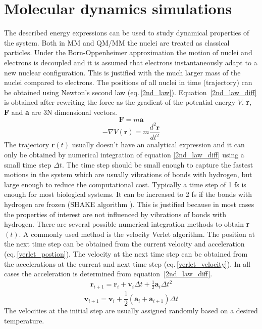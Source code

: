 \section{Molecular dynamics simulations}
The described energy expressions can be used to study dynamical properties of the system. Both in MM and QM/MM the nuclei are treated as classical particles. Under the Born-Oppenheimer approximation the motion of nuclei and electrons is decoupled and it is assumed that electrons instantaneously adapt to a new nuclear configuration. This is justified with the much larger mass of the nuclei compared to electrons. The positions of all nuclei in time (trajectory) can be obtained using Newton's second law (eq.\,\ref{2nd_law}). Equation~\ref{2nd_law_diff} is obtained after rewriting the force as the gradient of the potential energy $V$. \textbf{r}, \textbf{F} and \textbf{a} are 3N dimensional vectors.
\begin{equation} \label{2nd_law}
    \textbf{F} = m \textbf{a}
\end{equation}
\begin{equation} \label{2nd_law_diff}
    - \nabla V(\textbf{r}) = m \frac{d^2 \textbf{r}}{dt^2}
\end{equation}
The trajectory \textbf{r}$(t)$ usually doesn't have an analytical expression and it can only be obtained by numerical integration of equation \ref{2nd_law_diff} using a small time step $\Delta t$. The time step should be small enough to capture the fastest motions in the system which are usually vibrations of bonds with hydrogen, but large enough to reduce the computational cost. Typically a time step of 1 fs is enough for most biological systems. It can be increased to 2 fs if the bonds with hydrogen are frozen (SHAKE algorithm \cite{Tobias1988}). This is justified because in most cases the properties of interest are not influenced by vibrations of bonds with hydrogen. There are several possible numerical integration methods to obtain \textbf{r}$(t)$. A commonly used method is the velocity Verlet algorithm. The position at the next time step can be obtained from the current velocity and acceleration (eq.\,\ref{verlet_postion}). The velocity at the next time step can be obtained from the accelerations at the current and next time step (eq.\,\ref{verlet_velocity}). In all cases the acceleration is determined from equation~\ref{2nd_law_diff}.
\begin{gather} \label{verlet_postion}
    \textbf{r}_{i+1} = \textbf{r}_{i} + \textbf{v}_{i} \Delta t + \frac{1}{2} \textbf{a}_{i} \Delta t^2
\end{gather}
\begin{equation} \label{verlet_velocity}
    \textbf{v}_{i+1} = \textbf{v}_{i} + \frac{1}{2} (\textbf{a}_{i} + \textbf{a}_{i+1}) \Delta t
\end{equation}
The velocities at the initial step are usually assigned randomly based on a desired temperature.

